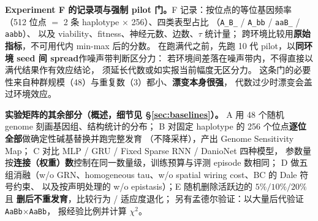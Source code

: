 \textbf{Experiment F 的记录项与强制 pilot 门。}F 记录：按位点的等位基因频率
（512 位点 $=$ 2 条 haplotype $\times$ 256）、四类表型占比
（\texttt{A\_B\_} / \texttt{A\_bb} / \texttt{aaB\_} / \texttt{aabb}）、
以及 viability、fitness、神经元数、边数、$\tau$ 统计量；
跨环境比较用\textbf{原始指标}，不可用代内 min-max 后的分数。
在跑满代之前，先跑 10 代 pilot，以\textbf{同环境 seed 间 spread}作噪声带判断区分力：
若环境间差落在噪声带内，不得直接以满代结果作有效应结论，
须延长代数或如实报当前幅度无区分力。
这条门的必要性来自种群规模（48）与重复数（3）都小、\textbf{漂变本身很强}，
代数过少时漂变会盖过环境效应。

\textbf{实验矩阵的其余部分（概述，细节见 \S\ref{sec:baselines}）。}
A 用 48 个随机 genome 刻画基因组、结构统计的分布；
B 对固定 haplotype 的 256 个位点\textbf{逐位全部}做确定性碱基替换并跑完整发育
（不降采样），产出 Genome Sensitivity Map；
C 对比 MLP / GRU / Fixed Sparse RNN / DanioNet 四种模型，
参数量按\textbf{连接（权重）数}控制在同一数量级，训练预算与评测 episode 数相同；
D 做五组消融（w/o GRN、homogeneous tau、w/o spatial wiring cost、BC 的 Dale 符号约束、
以及按声明处理的 w/o epistasis）；E 随机删除活跃边的 $5\%/10\%/20\%$ 且
\textbf{删后不重发育}，比较行为 / 适应度退化；
另有孟德尔验证：以大量后代验证 \texttt{AaBb}$\times$\texttt{AaBb}，
报经验比例并计算 $\chi^2$。
